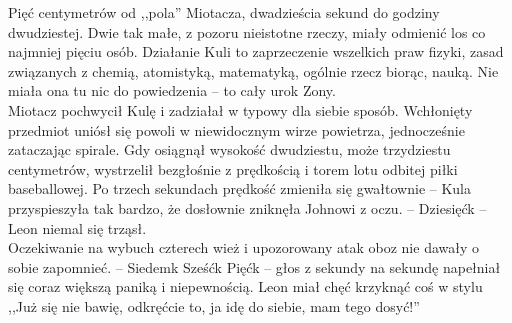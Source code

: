 \documentclass[../MAIN.tex]{subfiles}
\begin{document}
Pięć centymetrów od ,,pola'' Miotacza, dwadzieścia sekund do godziny dwudziestej. Dwie tak małe, z pozoru nieistotne rzeczy, miały odmienić los co najmniej pięciu osób. Działanie Kuli to zaprzeczenie wszelkich praw fizyki, zasad związanych z chemią, atomistyką, matematyką, ogólnie rzecz biorąc, nauką. Nie miała ona tu nic do powiedzenia -- to cały urok Zony. \\
Miotacz pochwycił Kulę i zadziałał w typowy dla siebie sposób. Wchłonięty przedmiot uniósł się powoli w niewidocznym wirze powietrza, jednocześnie zataczając spirale. Gdy osiągnął wysokość dwudziestu, może trzydziestu centymetrów, wystrzelił bezgłośnie z prędkością i torem lotu odbitej piłki baseballowej. Po trzech sekundach prędkość zmieniła się gwałtownie -- Kula przyspieszyła tak bardzo, że dosłownie zniknęła Johnowi z oczu.
\swk[7em] -- Dziesięć\3k -- \qwk
Leon niemal się trząsł. \\
Oczekiwanie na wybuch czterech wież i upozorowany atak oboz nie dawały o sobie zapomnieć.
\swk -- Siedem\3k Sześć\3k Pięć\3k -- \qwk
głos z sekundy na sekundę napełniał się coraz większą paniką i niepewnością. Leon miał chęć krzyknąć coś w stylu ,,Już się nie bawię, odkręćcie to, ja idę do siebie, mam tego dosyć!''
\end{document}
